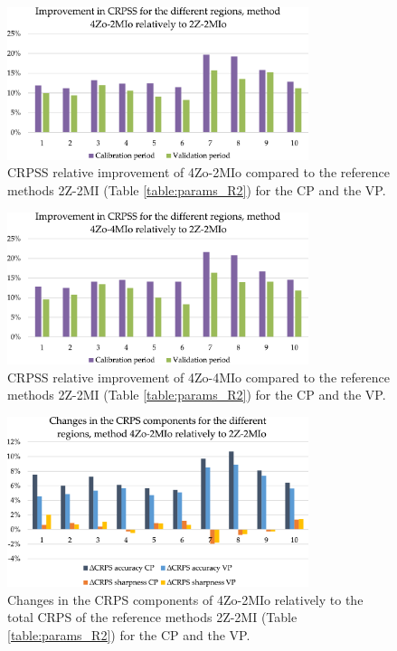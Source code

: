\documentclass[review]{elsarticle}
\begin{document}
\begin{figure}[t]
	\centerline{\includegraphics[width=8.8cm]{figures/fig08.pdf}}
	\caption{CRPSS relative improvement of 4Zo-2MIo compared to the reference methods 2Z-2MI (Table \ref{table:params_R2}) for the CP and the VP.}
	\label{fig:figure_dcrpss_4Zo-2HIo}
\end{figure}

\begin{figure}[t]
	\centerline{\includegraphics[width=8.8cm]{figures/fig09.pdf}}
	\caption{CRPSS relative improvement of 4Zo-4MIo compared to the reference methods 2Z-2MI (Table \ref{table:params_R2}) for the CP and the VP.}
	\label{fig:figure_dcrpss_4Zo-4HIo}
\end{figure}

\begin{figure}[t]
	\centerline{\includegraphics[width=8.8cm]{figures/fig10.pdf}}
	\caption{Changes in the CRPS components of 4Zo-2MIo relatively to the total CRPS of the reference methods 2Z-2MI (Table \ref{table:params_R2}) for the CP and the VP.}
	\label{fig:figure_dcrps_comp_4Zo-2HIo}
\end{figure}
\end{document}
